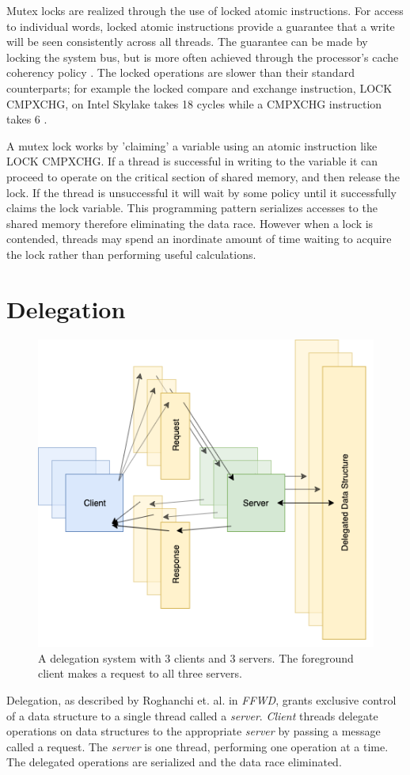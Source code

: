 \documentclass{uicthesi}
\begin{document}
Mutex locks are realized through the use of locked atomic instructions. For access to individual words, locked atomic instructions provide a guarantee that a write will be seen consistently across all threads. The guarantee can be made by locking the system bus, but is more often achieved through the processor's cache coherency policy \cite{IntelDevelopersManual}. The locked operations are slower than their standard counterparts; for example the locked compare and exchange instruction, LOCK CMPXCHG, on Intel Skylake takes 18 cycles while a CMPXCHG  instruction takes 6 \cite{agner}. 

A mutex lock works by 'claiming' a variable using an atomic instruction like LOCK CMPXCHG. If a thread is successful in writing to the variable it can proceed to operate on the critical section of shared memory, and then release the lock. If the thread is unsuccessful it will wait by some policy until it successfully claims the lock variable. This programming pattern serializes accesses to the shared memory therefore eliminating the data race. However when a lock is contended, threads may spend an inordinate amount of time waiting to acquire the lock rather than performing useful calculations. 

\section{Delegation}
\begin{figure}[ht!]
\centering
\includegraphics[width=0.9\columnwidth]{FIG/general_delegation.png}
\caption{A delegation system with 3 clients and 3 servers. The foreground client makes a request to all three servers. }
\label{fig:general_delegation}
\end{figure}
Delegation, as described by Roghanchi et. al. in \textit{FFWD}\cite{FFWD}, grants exclusive control of a data structure to a single thread called a \textit{server}. \textit{Client} threads delegate operations on data structures to the appropriate \textit{server} by passing a message called a request. The \textit{server} is one thread, performing one operation at a time. The delegated operations are serialized and the data race eliminated. 
\end{document}
